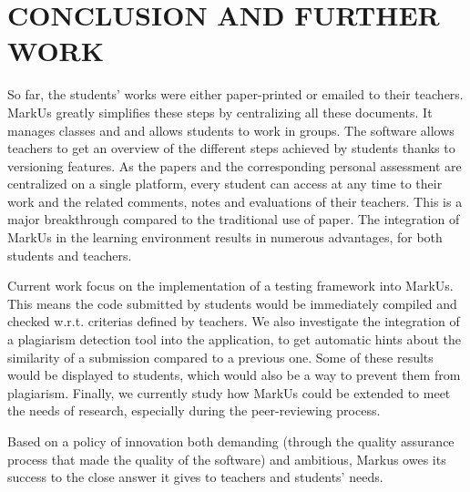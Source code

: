 \documentclass[twocolumn,10pt]{asme2e}
\begin{document}
\section*{CONCLUSION AND FURTHER WORK}

So far, the students' works were either paper-printed or emailed to their teachers. MarkUs greatly simplifies these steps by centralizing all these documents. It manages classes and and allows students to work in groups. The software allows teachers to get an overview of the different steps achieved by students thanks to versioning features. As the papers and the corresponding personal assessment are centralized on a single platform, every student can access at any time to their work and the related comments, notes and evaluations of their teachers. This is a major breakthrough compared to the traditional use of paper. The integration of MarkUs in the learning environment results in numerous advantages, for both students and teachers.

Current work focus on the implementation of a testing framework into MarkUs. This means the code submitted by students would be immediately compiled and checked w.r.t. criterias defined by teachers. We also investigate the integration of a plagiarism detection tool into the application, to get automatic hints about the similarity of a submission compared to a previous one. Some of these results would be displayed to students, which would also be a way to prevent them from plagiarism. Finally, we currently study how MarkUs could be extended to meet the needs of research, especially during the peer-reviewing process. 

Based on a policy of innovation both demanding (through the quality assurance process that made the quality of the software) and ambitious, Markus owes its success to the close answer it gives to teachers and students' needs. 


\end{document}
